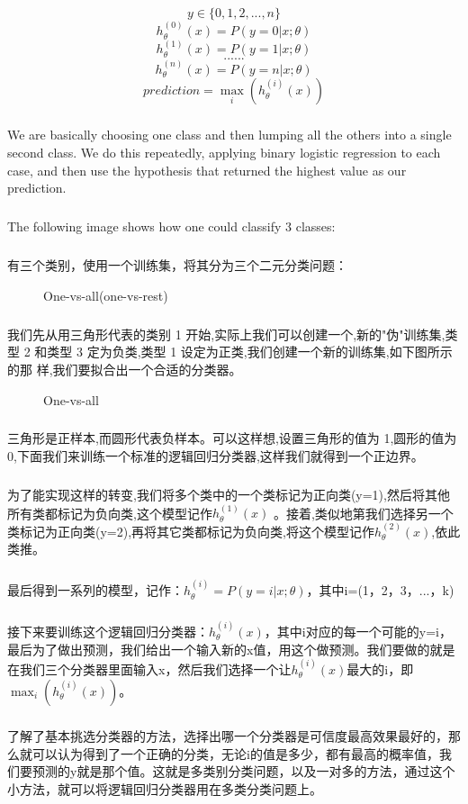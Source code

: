 \documentclass{article}
\begin{document}
\begin{CJK}{UTF8}{gbsn}
\subparagraph{}
\begin{equation}
y\in\lbrace{0,1,2,...,n}\rbrace
\end{equation}
\begin{equation}
h_\theta^{(0)}(x)=P(y=0|x;\theta)
\end{equation}
\begin{equation}
h_\theta^{(1)}(x)=P(y=1|x;\theta)
\end{equation}
\begin{equation}
......
\end{equation}
\begin{equation}
h_\theta^{(n)}(x)=P(y=n|x;\theta)
\end{equation}
\begin{equation}
prediction=\max_{i}(h_\theta^{(i)}(x))
\end{equation}
\subparagraph{}
We are basically choosing one class and then lumping all the others into a single second class. We do this repeatedly, applying binary logistic regression to each case, and then use the hypothesis that returned the highest value as our prediction.
\subparagraph{}
The following image shows how one could classify 3 classes: 
\subparagraph{}
有三个类别，使用一个训练集，将其分为三个二元分类问题：
\begin{figure}[H]
\caption{One-vs-all(one-vs-rest)}
\label{fig:336}
\end{figure}
\subparagraph{}
我们先从用三角形代表的类别 1 开始,实际上我们可以创建一个,新的"伪"训练集,类型 2 和类型 3 定为负类,类型 1 设定为正类,我们创建一个新的训练集,如下图所示的那
样,我们要拟合出一个合适的分类器。
\begin{figure}[H]
\caption{One-vs-all}
\label{fig:338}
\end{figure}
\subparagraph{}
三角形是正样本,而圆形代表负样本。可以这样想,设置三角形的值为 1,圆形的值为 0,下面我们来训练一个标准的逻辑回归分类器,这样我们就得到一个正边界。
\subparagraph{}
为了能实现这样的转变,我们将多个类中的一个类标记为正向类(y=1),然后将其他所有类都标记为负向类,这个模型记作$h_\theta^{(1)}(x)$
。接着,类似地第我们选择另一个类标记为正向类(y=2),再将其它类都标记为负向类,将这个模型记作$h_\theta^{(2)}(x)$,依此类推。
\subparagraph{}
最后得到一系列的模型，记作：$h_\theta^{(i)}=P(y=i|x;\theta)$，其中i=(1，2，3，...，k)
\subparagraph{}
接下来要训练这个逻辑回归分类器：$h_\theta^{(i)}(x)$，其中i对应的每一个可能的y=i，最后为了做出预测，我们给出一个输入新的x值，用这个做预测。我们要做的就是在我们三个分类器里面输入x，然后我们选择一个让$h_\theta^{(i)}(x)$最大的i，即$\max_{i}(h_\theta^{(i)}(x))$。
\subparagraph{}
了解了基本挑选分类器的方法，选择出哪一个分类器是可信度最高效果最好的，那么就可以认为得到了一个正确的分类，无论i的值是多少，都有最高的概率值，我们要预测的y就是那个值。这就是多类别分类问题，以及一对多的方法，通过这个小方法，就可以将逻辑回归分类器用在多类分类问题上。

\end{CJK}
\end{document}
